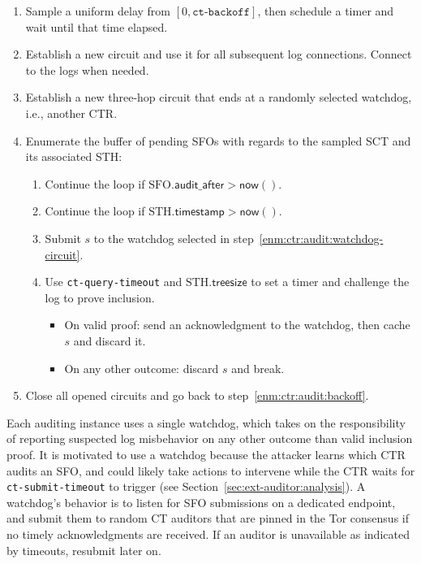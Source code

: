 \begin{enumerate}
	\item\label{enm:ctr:audit:backoff} Sample a uniform delay from
			$[0, \texttt{ct-backoff}]$,
		then schedule a timer and wait until that time elapsed.
	\item\label{enm:ctr:audit:log-circuit} Establish a new circuit and use it
		for all subsequent log connections.  Connect to the logs when needed.
	\item\label{enm:ctr:audit:watchdog-circuit} Establish a new three-hop
		circuit that ends at a randomly selected watchdog, i.e., another CTR.
	\item\label{enm:ctr:audit:loop} Enumerate the buffer of pending SFOs with
		regards to the sampled SCT and its associated STH:
		\begin{enumerate}
			\item\label{enm:ctr:audit:too-soon} Continue the loop if
				$\textrm{SFO}.\mathsf{audit\_after} > \mathsf{now}()$.
			\item\label{enm:ctr:audit:too-soon2} Continue the loop if
				$\textrm{STH}.\mathsf{timestamp} > \mathsf{now}()$.
			\item\label{enm:ctr:audit:watchdog} Submit $s$ to the
				watchdog selected in step~\ref{enm:ctr:audit:watchdog-circuit}.
			\item\label{enm:ctr:audit:challenge} Use \texttt{ct-query-timeout}
				and $\textrm{STH}.\mathsf{treesize}$ to set a timer and
				challenge the log to prove inclusion.
				\begin{itemize}
					\item On valid proof: send an acknowledgment to the
						watchdog, then cache $s$ and discard it.
					\item On any other outcome: discard $s$ and break.
				\end{itemize}
		\end{enumerate}
	\item\label{enm:ctr:audit:teardown} Close all opened circuits and go back to
		step~\ref{enm:ctr:audit:backoff}.
\end{enumerate}

Each auditing instance uses a single watchdog, which takes on the responsibility
of reporting suspected log misbehavior on any other outcome than valid inclusion
proof.  It is motivated to use a watchdog because the attacker learns which
CTR audits an SFO, and could likely take actions to intervene while the CTR
waits for \texttt{ct-submit-timeout} to trigger (see
Section~\ref{sec:ext-auditor:analysis}).  A watchdog's behavior is to listen for
SFO submissions on a dedicated endpoint, and submit them to random CT auditors
that are pinned in the Tor consensus if no timely acknowledgments are received.
If an auditor is unavailable as indicated by timeouts, resubmit later on.

